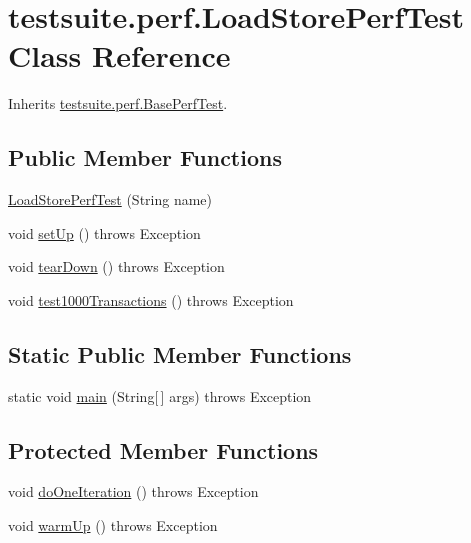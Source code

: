 \hypertarget{classtestsuite_1_1perf_1_1_load_store_perf_test}{}\section{testsuite.\+perf.\+Load\+Store\+Perf\+Test Class Reference}
\label{classtestsuite_1_1perf_1_1_load_store_perf_test}


Inherits \mbox{\hyperlink{classtestsuite_1_1perf_1_1_base_perf_test}{testsuite.\+perf.\+Base\+Perf\+Test}}.

\subsection*{Public Member Functions}
\begin{DoxyCompactItemize}
\item 
\mbox{\hyperlink{classtestsuite_1_1perf_1_1_load_store_perf_test_afe1fdb0e449dd028376e94eaaa9d9b68}{Load\+Store\+Perf\+Test}} (String name)
\item 
void \mbox{\hyperlink{classtestsuite_1_1perf_1_1_load_store_perf_test_a2c23eb5745202ad5793e966752a87ab7}{set\+Up}} ()  throws Exception 
\item 
void \mbox{\hyperlink{classtestsuite_1_1perf_1_1_load_store_perf_test_a8c9cc35a3ee0fc42720dc2090ec300b5}{tear\+Down}} ()  throws Exception 
\item 
void \mbox{\hyperlink{classtestsuite_1_1perf_1_1_load_store_perf_test_a0092e8eee45c82e1e740f52b0e93cd42}{test1000\+Transactions}} ()  throws Exception 
\end{DoxyCompactItemize}
\subsection*{Static Public Member Functions}
\begin{DoxyCompactItemize}
\item 
static void \mbox{\hyperlink{classtestsuite_1_1perf_1_1_load_store_perf_test_ab6e6a7c9d6a4facf8b8df79d201d8837}{main}} (String\mbox{[}$\,$\mbox{]} args)  throws Exception 
\end{DoxyCompactItemize}
\subsection*{Protected Member Functions}
\begin{DoxyCompactItemize}
\item 
void \mbox{\hyperlink{classtestsuite_1_1perf_1_1_load_store_perf_test_aae53536cc1145eb4860cc71c132f66d8}{do\+One\+Iteration}} ()  throws Exception 
\item 
void \mbox{\hyperlink{classtestsuite_1_1perf_1_1_load_store_perf_test_aedfa3a61f8e71a59e738a6b6e9d27d0e}{warm\+Up}} ()  throws Exception 
\end{DoxyCompactItemize}
